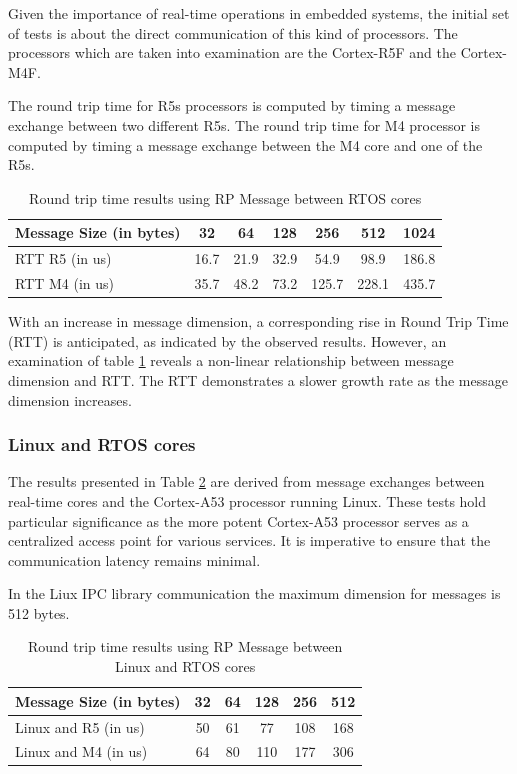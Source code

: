 Given the importance of real-time operations in embedded systems, the initial 
set of tests is about the direct communication of this kind of processors.
The processors which are taken into examination are the Cortex-R5F and the
Cortex-M4F.

The round trip time for R5s processors is computed by timing a message exchange
between two different R5s.
The round trip time for M4 processor is computed by timing a message exchange
between the M4 core and one of the R5s.

\begin{table}[H]
\centering
\caption{Round trip time results using RP Message between RTOS cores}
\label{table:direct_communication_RTOS_cores}
\begin{tabular}{lcccccc}
\toprule
Message Size (in bytes) & 32 & 64 & 128 & 256 & 512 & 1024 \\
\midrule
RTT R5 (in us) & 16.7 & 21.9 & 32.9 & 54.9 & 98.9 & 186.8 \\
RTT M4 (in us) & 35.7 & 48.2 & 73.2 & 125.7 & 228.1 & 435.7 \\
\bottomrule
\end{tabular}
\end{table}

With an increase in message dimension, a corresponding rise in Round Trip Time
(RTT) is anticipated, as indicated by the observed results. However, an
examination of table \ref{table:direct_communication_RTOS_cores} reveals a
non-linear relationship between message dimension and RTT.
The RTT demonstrates a slower growth rate as the message dimension increases.

\subsubsection{Linux and RTOS cores}

The results presented in Table \ref{table:direct_communication_linux_RTOS_cores}
are derived from message exchanges between real-time cores and the Cortex-A53
processor running Linux.
These tests hold particular significance as the more potent Cortex-A53 processor
serves as a centralized access point for various services.
It is imperative to ensure that the communication latency remains minimal.

In the Liux IPC library communication the maximum dimension for messages is
512 bytes.

\begin{table}[H]
\centering
\caption{Round trip time results using RP Message between Linux and RTOS cores}
\label{table:direct_communication_linux_RTOS_cores}
\begin{tabular}{lccccc}
\toprule
Message Size (in bytes) & 32 & 64 & 128 & 256 & 512 \\
\midrule
Linux and R5 (in us) & 50 & 61 & 77 & 108 & 168 \\
Linux and M4 (in us) & 64 & 80 & 110 & 177 & 306 \\
\bottomrule
\end{tabular}
\end{table}

